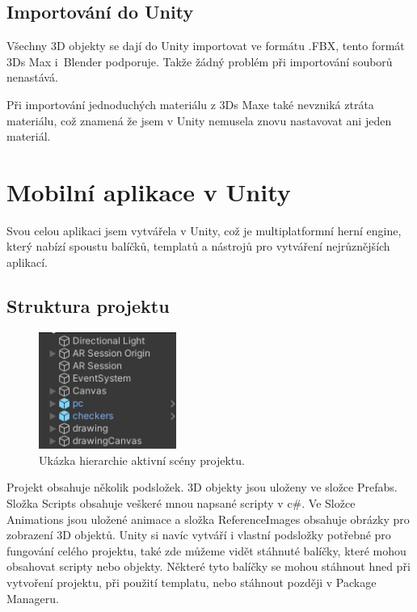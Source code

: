 \documentclass[12pt, a4paper,
twoside,        %
openright
]{report}
\begin{document}
\section {Importování do Unity}
\label{import_do_unity}
Všechny 3D objekty se dají do Unity importovat ve formátu .FBX, tento formát 3Ds Max i~Blender podporuje. Takže žádný problém při importování souborů nenastává.

Při importování jednoduchých materiálu z 3Ds Maxe také nevzniká ztráta materiálu, což znamená že jsem v Unity nemusela znovu nastavovat ani jeden materiál. 






\chapter{Mobilní aplikace v Unity}	

Svou celou aplikaci jsem vytvářela v Unity, což je multiplatformní herní engine, který nabízí spoustu balíčků, templatů a nástrojů pro vytváření nejrůznějších aplikací.  

	\section{Struktura projektu}
\label{sec:struktura_projektu}

		\begin{figure}[h!]
	\centering 
	\includegraphics[width=0.4\textwidth]{image/hierarchy.jpg} 
	\caption{Ukázka hierarchie aktivní scény projektu.} 
	\label{fig:hierarchie} 
\end{figure}


	Projekt obsahuje několik podsložek. 
	3D objekty jsou uloženy ve složce Prefabs. Složka Scripts obsahuje veškeré mnou napsané scripty v c\#. Ve Složce Animations jsou uložené animace a složka ReferenceImages obsahuje obrázky pro zobrazení 3D objektů. Unity si navíc vytváří i vlastní podsložky potřebné pro fungování celého projektu, také zde můžeme vidět stáhnuté balíčky, které mohou obsahovat scripty nebo objekty. Některé tyto balíčky se mohou stáhnout hned při vytvoření projektu, při použití templatu, nebo stáhnout později v Package Manageru.
	
\end{document}
